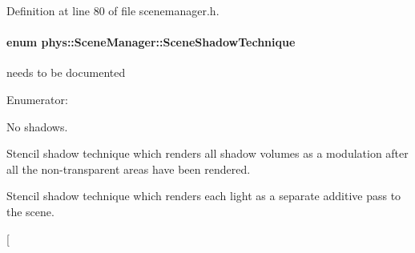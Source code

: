 Definition at line 80 of file scenemanager.h.

\hypertarget{classphys_1_1SceneManager_a427f1bbb52c11ad07352ae01d8b3c746}{
\paragraph[{SceneShadowTechnique}]{\setlength{\rightskip}{0pt plus 5cm}enum {\bf phys::SceneManager::SceneShadowTechnique}}\hfill}
\label{classphys_1_1SceneManager_a427f1bbb52c11ad07352ae01d8b3c746}


needs to be documented 

\begin{Desc}
\item[Enumerator: ]\par
\begin{description}
\item[{\em 
\hypertarget{classphys_1_1SceneManager_a427f1bbb52c11ad07352ae01d8b3c746ad96e23ac363ae9de73e2d3816ae66f2e}{
SST\_\-None}
\label{classphys_1_1SceneManager_a427f1bbb52c11ad07352ae01d8b3c746ad96e23ac363ae9de73e2d3816ae66f2e}
}]No shadows. \item[{\em 
\hypertarget{classphys_1_1SceneManager_a427f1bbb52c11ad07352ae01d8b3c746a9b11aebab7ffc5ff359f5a49b4ff5e7d}{
SST\_\-Stencil\_\-Modulative}
\label{classphys_1_1SceneManager_a427f1bbb52c11ad07352ae01d8b3c746a9b11aebab7ffc5ff359f5a49b4ff5e7d}
}]Stencil shadow technique which renders all shadow volumes as a modulation after all the non-\/transparent areas have been rendered. \item[{\em 
\hypertarget{classphys_1_1SceneManager_a427f1bbb52c11ad07352ae01d8b3c746a17ba96aa6b125ac6c787851815370d97}{
SST\_\-Stencil\_\-Additive}
\label{classphys_1_1SceneManager_a427f1bbb52c11ad07352ae01d8b3c746a17ba96aa6b125ac6c787851815370d97}
}]Stencil shadow technique which renders each light as a separate additive pass to the scene. \item[{\em 
}
\end{description}
\end{Desc}

